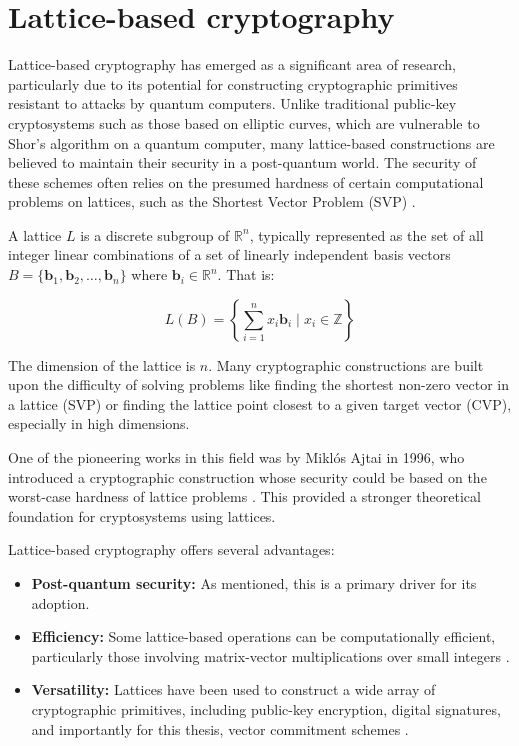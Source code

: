 \section{Lattice-based cryptography}\label{sec:lattices}

Lattice-based cryptography has emerged as a significant area of research,
particularly due to its potential for constructing cryptographic primitives
resistant to attacks by quantum computers. Unlike traditional public-key
cryptosystems such as those based on elliptic curves, which are vulnerable to
Shor's algorithm on a quantum computer, many lattice-based constructions are
believed to maintain their security in a post-quantum world. The security of
these schemes often relies on the presumed hardness of certain computational
problems on lattices, such as the Shortest Vector Problem (SVP) \cite{AjtaiLattices, LatticeTutorial, Ajtai1998}.

A lattice $L$ is a discrete subgroup of $\mathbb{R}^n$, typically
represented as the set of all integer linear combinations of a set of linearly
independent basis vectors $B = \{\mathbf{b}_1, \mathbf{b}_2, \dots, \mathbf{b}_n\}$
where $\mathbf{b}_i \in \mathbb{R}^n$. That is:

\begin{equation}
	L(B) = \left\{ \sum_{i=1}^{n} x_i \mathbf{b}_i \mid x_i \in \mathbb{Z} \right\}
\end{equation}

The dimension of the lattice is $n$. Many cryptographic constructions are
built upon the difficulty of solving problems like finding the shortest
non-zero vector in a lattice (SVP) or finding the lattice point closest to a
given target vector (CVP), especially in high dimensions.

One of the pioneering works in this field was by Miklós Ajtai in 1996, who
introduced a cryptographic construction whose security could be based on the
worst-case hardness of lattice problems \cite{AjtaiLattices}. This provided a
stronger theoretical foundation for cryptosystems using lattices.

\pagebreak

Lattice-based cryptography offers several advantages:

\begin{itemize}
	\item \textbf{Post-quantum security:} As mentioned, this is a primary driver for its adoption.
	\item \textbf{Efficiency:} Some lattice-based operations can be
	      computationally efficient, particularly those involving matrix-vector
	      multiplications over small integers \cite{LatticeTutorial}.
	\item \textbf{Versatility:} Lattices have been used to construct a wide
	      array of cryptographic primitives, including public-key encryption,
	      digital signatures, and importantly for this thesis, vector commitment
	      schemes \cite{LatticeTutorial}.
\end{itemize}

